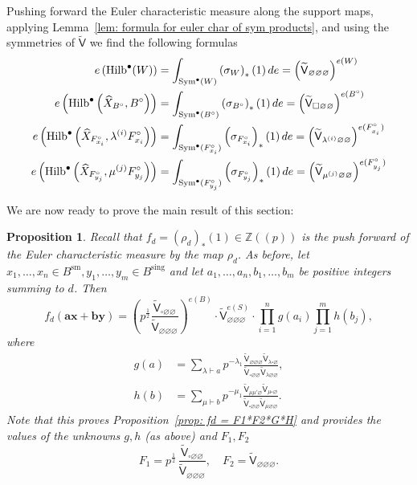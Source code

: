 \documentclass[12pt]{amsart}
\newtheorem{proposition}[theorem]{Proposition}
\theoremstyle{definition}
\newcommand{\ZZ} {\mathbb{Z}}		%
\newcommand{\sfVtilde}{\widetilde{\mathsf{V}}}
\newcommand{\Sym}{\operatorname{Sym}}
\newcommand{\Hilb}{\operatorname{Hilb}}
\newcommand{\sm}{\operatorname{sm}}
\newcommand{\sing}{\operatorname{sing}}
\newcommand{\boldx}{\boldsymbol{x}}
\newcommand{\boldy}{\boldsymbol{y}}
\newcommand{\bolda}{\boldsymbol{a}}
\newcommand{\boldb}{\boldsymbol{b}}
\renewcommand{\emptyset}{\varnothing}
\newcommand{\Xhat}{\widehat{X}}
\newcommand{\half}{\frac{1}{2}}
\newcommand{\bx}{\square}
\begin{document}
Pushing forward the Euler characteristic measure along the support
maps, applying Lemma~\ref{lem: formula for euler char of sym
products}, and using the symmetries of $\sfVtilde$ we find the
following formulas
\begin{align}\label{eqn: e(Hilb(Xhat,Bcirc))=V^{e(Bcirc)}}
e\left(\Hilb^{\bullet}(W) \right) & = \int_{\Sym^{\bullet}(W)}
\left(\sigma_{W} \right)_{*}(1)\, de = \left(\sfVtilde_{\emptyset \emptyset \emptyset }\right)^{e(W)}\\
e\left(\Hilb^{\bullet}\left(\Xhat_{B^{\circ}},B^{\circ} \right) \right) & = \int_{\Sym^{\bullet}(B^{\circ })}
\left(\sigma_{B^{\circ }} \right)_{*}(1)\, de = \left(\sfVtilde_{\bx \emptyset \emptyset }\right)^{e(B^{\circ })}\nonumber \\
e\left(\Hilb^{\bullet}\left(\Xhat_{F_{x_{i}}^{\circ}},\lambda^{(i)}F_{x_{i}}^{\circ} \right) \right) & = \int_{\Sym^{\bullet}(F_{x_{i}}^{\circ })}
\left(\sigma_{F_{x_{i}}^{\circ }} \right)_{*}(1)\, de = \left(\sfVtilde_{\lambda^{(i)} \emptyset  \emptyset }\right)^{e(F_{_{x_{i}}}^{\circ })}\nonumber \\
e\left(\Hilb^{\bullet}\left(\Xhat_{F_{y_{j}}^{\circ}},\mu^{(j)}F_{y_{j}}^{\circ} \right) \right) & = \int_{\Sym^{\bullet}(F_{y_{j}}^{\circ })}
\left(\sigma_{F_{y_{j}}^{\circ }} \right)_{*}(1)\, de =
\left(\sfVtilde_{\mu^{(j)} \emptyset  \emptyset
}\right)^{e(F_{_{y_{j}}}^{\circ })} \nonumber
\end{align}

We are now ready to prove the main result of this section:

\begin{proposition}\label{prop: formula for fd in terms of the
normalized vertex} Recall that $f_{d}=\left(\rho_{d} \right)_{*}(1)\in
\ZZ (\!(p)\!)$ is the push forward of the Euler characteristic measure by
the map $\rho_{d}$. As before, let $x_{1},\dotsc ,x_{n}\in
B^{\sm},y_{1},\dotsc ,y_{m}\in B^{\sing }$ and let $a_{1},\dotsc
,a_{n},b_{1},\dotsc ,b_{m}$ be positive integers summing to $d$. Then
\[
f_{d}\left(\bolda \boldx +\boldb \boldy  \right)  =
\left(p^{\half}\frac{\sfVtilde_{\bx \emptyset
\emptyset}}{\sfVtilde_{\emptyset \emptyset \emptyset}} \right)^{e(B)}
\cdot \sfVtilde^{e(S)}_{\emptyset \emptyset \emptyset} \cdot
\prod_{i=1}^{n}g(a_{i}) \prod_{j=1}^{m} h(b_{j}),
\]
where
\begin{align*}
g(a)& = \sum_{\lambda \vdash a} p^{-\lambda_{1}}
\frac{\sfVtilde_{\emptyset \emptyset \emptyset} \sfVtilde_{\lambda \bx 
\emptyset}}{\sfVtilde_{\bx \emptyset \emptyset} \sfVtilde_{\lambda
\emptyset \emptyset}},\\
h(b) &= \sum_{\mu \vdash b} p^{-\mu_{1}} \frac{\sfVtilde_{\mu \mu'
\emptyset} \sfVtilde_{ \mu \bx \emptyset}}{\sfVtilde_{\bx \emptyset
\emptyset} \sfVtilde_{\mu \emptyset \emptyset}}.
\end{align*}
Note that this proves Proposition~\ref{prop: fd = F1*F2*G*H} and
provides the values of the unknowns $g,h$ (as above) and
$F_{1},F_{2}$
\[
F_{1} = p^{\half}\,\frac{\sfVtilde_{\bx \emptyset
\emptyset}}{\sfVtilde_{\emptyset \emptyset \emptyset}} , \quad
F_{2} =\sfVtilde_{\emptyset \emptyset \emptyset}. 
\]
\end{proposition}
\end{document}
